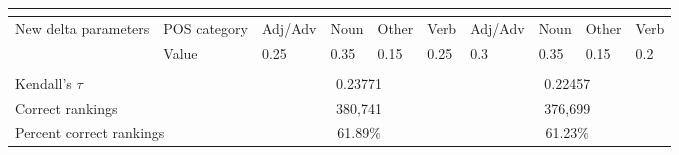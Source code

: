 \documentclass[paper=a4, fontsize=11pt]{scrartcl}
\numberwithin{equation}{section}		%
\numberwithin{figure}{section}			%
\numberwithin{table}{section}				%
\begin{document}
\begin{table}[htbp]
{\begin{tabular}{llllllclll}
                                                            &                                    &                              &                           &                            &                           & \multicolumn{1}{l}{}         &                           &                            & \multicolumn{1}{l|}{}     \\ \hline
\multicolumn{1}{|l|}{\multirow{2}{*}{New delta parameters}} & \multicolumn{1}{l|}{POS category}  & \multicolumn{1}{l|}{Adj/Adv} & \multicolumn{1}{l|}{Noun} & \multicolumn{1}{l|}{Other} & \multicolumn{1}{l|}{Verb} & \multicolumn{1}{l|}{Adj/Adv} & \multicolumn{1}{l|}{Noun} & \multicolumn{1}{l|}{Other} & \multicolumn{1}{l|}{Verb} \\ \cline{2-10} 
\multicolumn{1}{|l|}{}                                      & \multicolumn{1}{l|}{Value}         & \multicolumn{1}{l|}{0.25}    & \multicolumn{1}{l|}{0.35} & \multicolumn{1}{l|}{0.15}  & \multicolumn{1}{l|}{0.25} & \multicolumn{1}{l|}{0.3}     & \multicolumn{1}{l|}{0.35} & \multicolumn{1}{l|}{0.15}  & \multicolumn{1}{l|}{0.2}  \\ \hline
\multicolumn{1}{|l}{}                                       &                                    &                              &                           &                            &                           & \multicolumn{1}{l}{}         &                           &                            & \multicolumn{1}{l|}{}     \\ \hline
\multicolumn{2}{|l|}{Kendall's $\tau$}                                                           & \multicolumn{4}{c|}{0.23771}                                                                                      & \multicolumn{4}{c|}{0.22457}                                                                                      \\ \hline
\multicolumn{2}{|l|}{Correct rankings}                                                           & \multicolumn{4}{c|}{380,741}                                                                                      & \multicolumn{4}{c|}{376,699}                                                                                      \\ \hline
\multicolumn{2}{|l|}{Percent correct rankings}                                                   & \multicolumn{4}{c|}{61.89\%}                                                                                      & \multicolumn{4}{c|}{61.23\%}                                                                                      \\ \hline
\end{tabular}}
\end{table}
\end{document}
